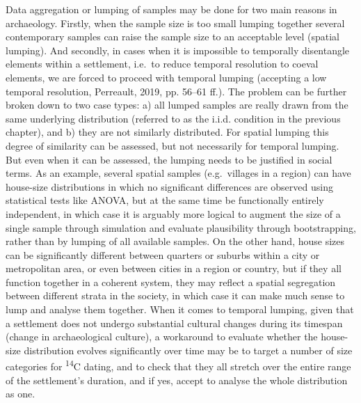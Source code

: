 \documentclass[
  12pt,
]{book}
\begin{document}
Data aggregation or lumping of samples may be done for two main reasons in archaeology. Firstly, when the sample size is too small lumping together several contemporary samples can raise the sample size to an acceptable level (spatial lumping). And secondly, in cases when it is impossible to temporally disentangle elements within a settlement, i.e.~to reduce temporal resolution to coeval elements, we are forced to proceed with temporal lumping (accepting a low temporal resolution, Perreault, 2019, pp. 56--61 ff.). The problem can be further broken down to two case types: a) all lumped samples are really drawn from the same underlying distribution (referred to as the i.i.d. condition in the previous chapter), and b) they are not similarly distributed. For spatial lumping this degree of similarity can be assessed, but not necessarily for temporal lumping. But even when it can be assessed, the lumping needs to be justified in social terms. As an example, several spatial samples (e.g.~villages in a region) can have house-size distributions in which no significant differences are observed using statistical tests like ANOVA, but at the same time be functionally entirely independent, in which case it is arguably more logical to augment the size of a single sample through simulation and evaluate plausibility through bootstrapping, rather than by lumping of all available samples. On the other hand, house sizes can be significantly different between quarters or suburbs within a city or metropolitan area, or even between cities in a region or country, but if they all function together in a coherent system, they may reflect a spatial segregation between different strata in the society, in which case it can make much sense to lump and analyse them together. When it comes to temporal lumping, given that a settlement does not undergo substantial cultural changes during its timespan (change in archaeological culture), a workaround to evaluate whether the house-size distribution evolves significantly over time may be to target a number of size categories for \textsuperscript{14}C dating, and to check that they all stretch over the entire range of the settlement's duration, and if yes, accept to analyse the whole distribution as one.
\end{document}
